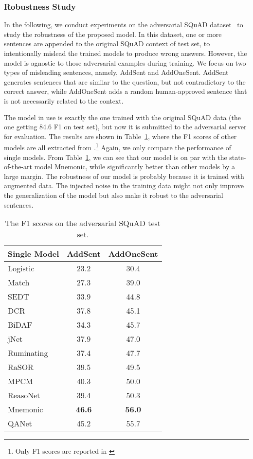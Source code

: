 \documentclass{article} \usepackage{iclr2018_conference,times}
\begin{document}
\subsubsection{Robustness Study}
In the following, we conduct experiments on the adversarial SQuAD dataset~\citep{JiaL17} to study the robustness of the proposed model. 
In this dataset, one or more sentences are appended to the original SQuAD context of test set, to intentionally mislead the trained models to produce wrong answers. However, the model is agnostic to those adversarial examples during training.
We focus on two types of misleading sentences, namely, AddSent and AddOneSent. AddSent generates
sentences that are similar to the question, but
not contradictory to the correct answer, while AddOneSent adds
a random human-approved sentence that is not necessarily related to the context.

The model in use is exactly the one trained with the original SQuAD data (the one getting 84.6 F1 on test set), but now it is submitted to the adversarial server for evaluation. 
The results are shown in Table~\ref{table:squad_adversarial}, where the F1 scores of other models are all extracted from \cite{JiaL17}.\footnote{Only F1 scores are reported in \cite{JiaL17}} Again, we only compare the performance of single models. From Table~\ref{table:squad_adversarial}, we can see that our model is on par with the state-of-the-art model Mnemonic, while significantly better than other models by a large margin. The robustness of our model is probably because it is trained with augmented data. The injected noise in the training data might not only improve the generalization of the model but also make it robust to the adversarial sentences.  

\begin{table}[ht]
\small
\begin{center}
\begin{tabular}{lcc}
\hline Single Model & AddSent  & AddOneSent \\\hline
Logistic~\citep{RajpurkarZLL16} & 23.2 & 30.4\\
Match~\citep{WangJ16a} & 27.3 & 39.0\\
SEDT~\citep{LiuHWYN17} & 33.9 & 44.8\\
DCR~\citep{YuZHYXZ16} & 37.8 & 45.1 \\
BiDAF~\citep{SeoKFH16} & 34.3 & 45.7\\
jNet~\citep{ZhangZCDWJ17} & 37.9 & 47.0 \\
Ruminating~\citep{GongB17} & 37.4 & 47.7 \\
RaSOR~\citep{LeeKP016} & 39.5 & 49.5\\
MPCM~\citep{WangMHF16}  & 40.3 & 50.0\\
ReasoNet~\citep{ShenHGC17} & 39.4 & 50.3\\
Mnemonic~\citep{HuPQ17} & \textbf{46.6} & \textbf{56.0}\\
\hline
QANet & 45.2 &  55.7 \\
\hline \end{tabular}
\end{center}
\caption{The F1 scores on the adversarial SQuAD test set. 
}
\label{table:squad_adversarial}
\end{table}
\end{document}
